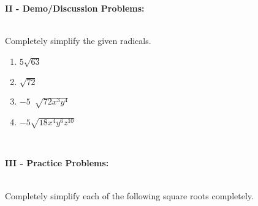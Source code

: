 \documentclass[12pt]{article}
\theoremstyle{definition}
\begin{document}
{\bf II - Demo/Discussion Problems:}\\
\ \par
Completely simplify the given radicals.
\begin{multicols}{4}
\begin{enumerate}
	\item $5\sqrt{63}$
	\item $\sqrt{72}$
  \item $- 5~\sqrt[]{72 x^3 y^4}$
	\item $-5\sqrt{18x^4y^6z^{10}}$
\end{enumerate}
\end{multicols}
\ \par
{\bf III - Practice Problems:}\\
\ \par
Completely simplify each of the following square roots completely.
\end{document}
